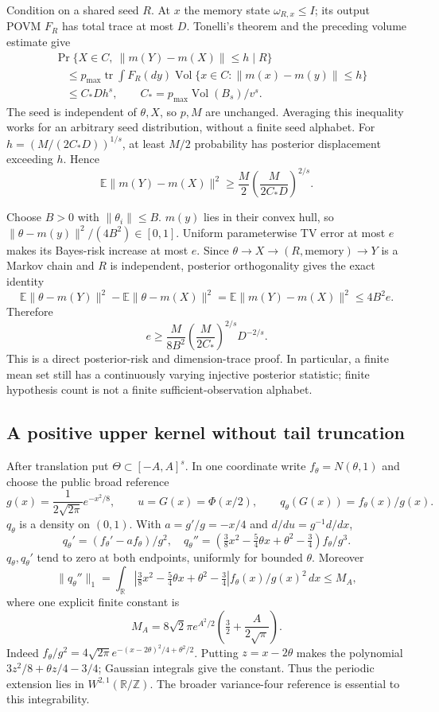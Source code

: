 \documentclass[11pt]{article}
\theoremstyle{definition}
\DeclareMathOperator{\tr}{tr}
\newcommand{\R}{\mathbb R}
\newcommand{\E}{\mathbb E}
\begin{document}
Condition on a shared seed $R$. At $x$ the memory state
$\omega_{R,x}\le I$; its output POVM $F_R$ has total trace at most $D$.
Tonelli's theorem and the preceding volume estimate give
\begin{align*}
 &\Pr\{X\in C,\ \|m(Y)-m(X)\|\le h\mid R\}\\
 &\quad\le
 p_{\max}\tr\int F_R(dy)
 \operatorname{Vol}\{x\in C:\|m(x)-m(y)\|\le h\}\\
 &\quad\le C_*Dh^s,\qquad
 C_*=p_{\max}\operatorname{Vol}(B_s)/v^s.
\end{align*}
The seed is independent of $\theta,X$, so $p,M$ are unchanged.
Averaging this inequality works for an arbitrary seed distribution,
without a finite seed alphabet.
For $h=(M/(2C_*D))^{1/s}$, at least $M/2$ probability has
posterior displacement exceeding $h$. Hence
\[
 \E\|m(Y)-m(X)\|^2
 \ge\frac M2\left(\frac{M}{2C_*D}\right)^{2/s}.
\]

Choose $B>0$ with $\|\theta_i\|\le B$.
$m(y)$ lies in their convex hull, so
$\|\theta-m(y)\|^2/(4B^2)\in[0,1]$.
Uniform parameterwise TV error at most $e$ makes its Bayes-risk
increase at most $e$. Since $\theta\to X\to(R,\text{memory})\to Y$
is a Markov chain and $R$ is independent, posterior orthogonality
gives the exact identity
\[
 \E\|\theta-m(Y)\|^2-\E\|\theta-m(X)\|^2
 =\E\|m(Y)-m(X)\|^2\le4B^2e.
\]
Therefore
\[
 e\ge\frac{M}{8B^2}
 \left(\frac{M}{2C_*}\right)^{2/s}D^{-2/s}.
\]
This is a direct posterior-risk and dimension-trace proof. In
particular, a finite mean set still has a continuously varying
injective posterior statistic; finite hypothesis count is not a
finite sufficient-observation alphabet.

\subsection{A positive upper kernel without tail truncation}
After translation put $\Theta\subset[-A,A]^s$. In one coordinate
write $f_\theta=N(\theta,1)$ and choose the public broad reference
\[
 g(x)=\frac1{2\sqrt{2\pi}}e^{-x^2/8},\qquad
 u=G(x)=\Phi(x/2),\qquad q_\theta(G(x))=f_\theta(x)/g(x).
\]
$q_\theta$ is a density on $(0,1)$.
With $a=g'/g=-x/4$ and $d/du=g^{-1}d/dx$,
\[
 q_\theta'=(f_\theta'-af_\theta)/g^2,\quad
 q_\theta''=
 \left(\tfrac38x^2-\tfrac54\theta x+\theta^2-\tfrac34\right)
 f_\theta/g^3.
\]
$q_\theta,q_\theta'$ tend to zero at both endpoints, uniformly for
bounded $\theta$. Moreover
\[
 \|q_\theta''\|_1
 =\int_\R\left|\tfrac38x^2-\tfrac54\theta x+\theta^2-\tfrac34\right|
 f_\theta(x)/g(x)^2\,dx
 \le M_A,
\]
where one explicit finite constant is
\[
 M_A=8\sqrt2\pi e^{A^2/2}
 \left(\tfrac32+\frac{A}{2\sqrt\pi}\right).
\]
Indeed $f_\theta/g^2=
4\sqrt{2\pi}e^{-(x-2\theta)^2/4+\theta^2/2}$.
Putting $z=x-2\theta$ makes the polynomial
$3z^2/8+\theta z/4-3/4$; Gaussian integrals give the constant.
Thus the periodic extension lies in $W^{2,1}(\R/\mathbb Z)$.
The broader variance-four reference is essential to this integrability.
\end{document}
